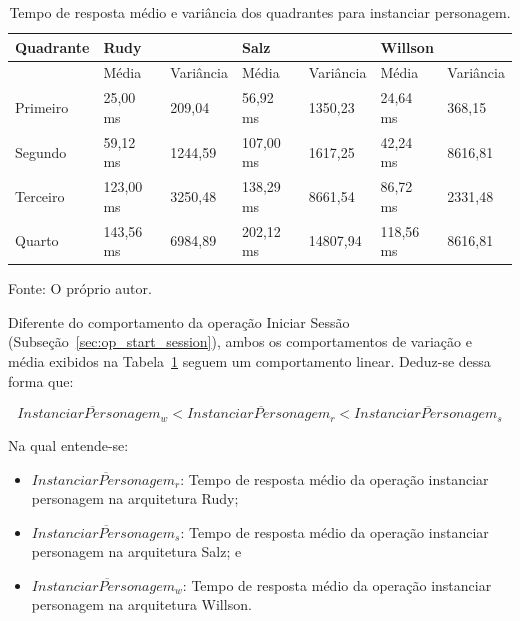 \begin{table}[htb!]
\centering
\begin{adjustbox}{max width=\textwidth}
\caption{Tempo de resposta médio e variância dos quadrantes para instanciar personagem.}
\label{tab:op_spawn_character}
\begin{tabular}{l||l|l||l|l||l|l}

\hline \hline

Quadrante & \multicolumn{2}{l||}{Rudy}    & \multicolumn{2}{l||}{Salz}    & \multicolumn{2}{l}{Willson} \\ \hline \hline

& Média & Variância & Média & Variância & Média & Variância \\ \hline

Primeiro  & 25,00 ms & 209,04 & 56,92 ms & 1350,23 & 24,64 ms & 368,15 \\ \hline

Segundo  & 59,12 ms & 1244,59 & 107,00 ms & 1617,25 & 42,24 ms & 8616,81 \\ \hline

Terceiro  & 123,00 ms & 3250,48 & 138,29 ms & 8661,54 & 86,72 ms & 2331,48 \\ \hline

Quarto  & 143,56 ms & 6984,89 & 202,12 ms & 14807,94 & 118,56 ms & 8616,81 \\ \hline \hline

\end{tabular}

\end{adjustbox}

Fonte: O próprio autor.
\end{table}

Diferente do comportamento da operação Iniciar Sessão (Subseção~\ref{sec:op_start_session}), ambos os comportamentos de variação e média exibidos na Tabela~\ref{tab:op_spawn_character} seguem um comportamento linear.
%
Deduz-se dessa forma que:

$$
  \overline{InstanciarPersonagem_{w}} < \overline{InstanciarPersonagem_{r}} <\overline{InstanciarPersonagem_{s}}
$$

Na qual entende-se:

\begin{itemize}
 \item $\overline{InstanciarPersonagem_{r}}$: Tempo de resposta médio da operação instanciar personagem na arquitetura Rudy;
 \item $\overline{InstanciarPersonagem_{s}}$: Tempo de resposta médio da operação instanciar personagem na arquitetura Salz; e
 \item $\overline{InstanciarPersonagem_{w}}$: Tempo de resposta médio da operação instanciar personagem na arquitetura Willson.
\end{itemize}


